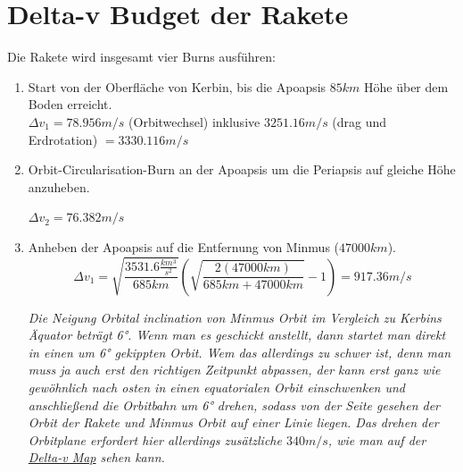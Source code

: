 \documentclass[12pt,paper=A4,numbers=noenddot,bibliography=totoc,listof=totoc,DIV=11,BCOR=1mm]{scrreprt}
\newcommand{\gq}[1]{\glqq #1\grqq} %
\begin{document}
\section{Delta-v Budget der Rakete}
\begin{flushleft}
Die Rakete wird insgesamt vier Burns ausführen:
\end{flushleft}
\begin{enumerate}
\item Start von der Oberfläche von Kerbin, bis die Apoapsis $85km$ Höhe über dem Boden erreicht. \\

$\Delta v_{1} = 78.956 m/s$ (Orbitwechsel) inklusive $3251.16 m/s$ (drag und Erdrotation) $= 3330.116 m/s$ \\

\item Orbit-Circularisation-Burn an der Apoapsis um die Periapsis auf gleiche Höhe anzuheben.
\begin{flushleft}
$\Delta v_{2} = 76.382 m/s$
\end{flushleft}
\item Anheben der Apoapsis auf die Entfernung von Minmus ($47000km$).\\
\begin{equation*}
\Delta v_{1} = \sqrt{\frac{3531.6 \frac{km^{3}}{s^{2}}}{685km}} \left( \sqrt{\frac{2(47000km)}{685km+47000km}}-1 \right) = 917.36 m/s
\end{equation*}

\emph{Die Neigung \gq{Orbital inclination} von Minmus Orbit im Vergleich zu Kerbins Äquator beträgt 6°. Wenn man es geschickt anstellt, dann startet man direkt in einen um 6° gekippten Orbit. Wem das allerdings zu schwer ist, denn man muss ja auch erst den richtigen Zeitpunkt abpassen, der kann erst ganz wie gewöhnlich nach osten in einen equatorialen Orbit einschwenken und anschließend die Orbitbahn um 6° drehen, sodass von der Seite gesehen der Orbit der Rakete und Minmus Orbit auf einer Linie liegen. Das drehen der \gq{Orbitplane} erfordert hier allerdings zusätzliche $340m/s$, wie man auf der \href{https://wiki.kerbalspaceprogram.com/wiki/File:KerbinDeltaVMap.png}{Delta-v Map} sehen kann.}\\


\end{enumerate}
\end{document}

